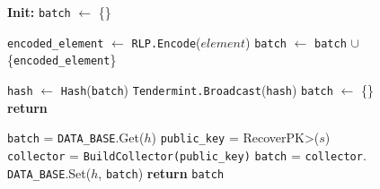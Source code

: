 \begin{figure}[t!]
  \begin{adjustbox}{minipage=[t]{\columnwidth}}
    \begin{algorithm}[H]
      \renewcommand{\thealgorithm}{Hash Collector}         
      \caption{}%
      \label{alg:collector-hash}%
      \small
      \begin{algorithmic}[1]
            \State \textbf{Init:} \texttt{batch} $\leftarrow$ \{\}
      
            \label{alg:hash_add_tx}
            			\State \texttt{encoded\_element} $\leftarrow$ \texttt{RLP.Encode}($element$)
					        \State \texttt{batch} $\leftarrow$ \texttt{batch} $\cup$ \{\texttt{encoded\_element}\}
                \EndIf
             		
             		  \State \texttt{hash} $\leftarrow$  \texttt{Hash}(\texttt{batch})
                	\State \texttt{Tendermint.Broadcast}(\texttt{hash})
                  \State \texttt{batch} $\leftarrow$ \{\}
             	  \EndIf
                \State \textbf{return}
            \EndFunction

            \smallskip

            \label{alg:hash_request_tx}
                \State \texttt{batch} = \texttt{DATA\_BASE}.Get($h$)
              \Else
                \State \texttt{public\_key} = \<RecoverPK>($s$)
                \State \texttt{collector} = \texttt{BuildCollector(public\_key)}
                \State \texttt{batch} = \texttt{collector}.
                \State \texttt{DATA\_BASE}.Set($h$, \texttt{batch})
              \EndIf
              \State \textbf{return} \texttt{batch}
            \EndFunction
            
        \end{algorithmic}
      \end{algorithm}
	\end{adjustbox}
  \end{figure}
